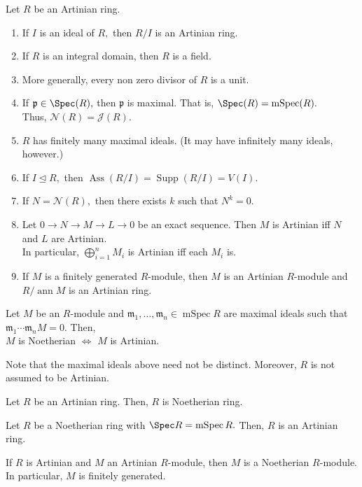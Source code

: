 \documentclass[12pt]{article}	%
\DeclareMathOperator{\Ass}{Ass}
\DeclareMathOperator{\mSpec}{mSpec}
\DeclareMathOperator{\Supp}{Supp}
\DeclareMathOperator{\ann}{ann}
\begin{document}
\begin{prop}
	Let $R$ be an Artinian ring.
	\begin{enumerate}
		\item If $I$ is an ideal of $R,$ then $R/I$ is an Artinian ring.
		\item If $R$ is an integral domain, then $R$ is a field.
		\item More generally, every non zero divisor of $R$ is a unit.
		\item If $\mathfrak{p} \in \Spec(R),$ then $\mathfrak{p}$ is maximal. That is, $\Spec(R) = \mSpec(R).$ \\
		Thus, $\mathcal{N}(R) = \mathcal{J}(R).$
		\item $R$ has finitely many maximal ideals. (It may have infinitely many ideals, however.)
		\item If $I \unlhd R,$ then $\Ass(R/I) = \Supp(R/I) = V(I).$
		\item If $N = \mathcal{N}(R),$ then there exists $k$ such that $N^k = 0.$
		\item Let $0 \to N \to M \to L \to 0$ be an exact sequence. Then $M$ is Artinian iff $N$ and $L$ are Artinian.\\
		In particular, $\bigoplus_{i = 1}^n M_i$ is Artinian iff each $M_i$ is.
		\item If $M$ is a finitely generated $R$-module, then $M$ is an Artinian $R$-module and $R/\ann M$ is an Artinian ring.
	\end{enumerate}
\end{prop}

\begin{prop}
	Let $M$ be an $R$-module and $\mathfrak{m}_1, \ldots, \mathfrak{m}_n \in \mSpec R$ are maximal ideals such that $\mathfrak{m}_1\cdots\mathfrak{m}_nM = 0.$ Then,\\
	$M$ is Noetherian $\iff$ $M$ is Artinian.
\end{prop}
Note that the maximal ideals above need not be distinct. Moreover, $R$ is not assumed to be Artinian.

\begin{prop}
	Let $R$ be an Artinian ring. Then, $R$ is Noetherian ring.
\end{prop}
\begin{prop}
	Let $R$ be a Noetherian ring with $\Spec R = \mSpec R.$ Then, $R$ is an Artinian ring.
\end{prop}

\begin{prop}
	If $R$ is Artinian and $M$ an Artinian $R$-module, then $M$ is a Noetherian $R$-module. In particular, $M$ is finitely generated.
\end{prop}
\end{document}

